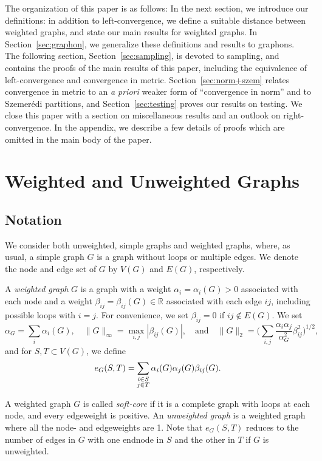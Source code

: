 \documentclass[12pt]{article}
\numberwithin{equation}{section}
\def\bsa{\begin{subarray}{c} }
\def\esa{\end{subarray} }
\def\R{{\mathbb R}}
\begin{document}
The organization of this paper is as follows: In the next section, we
introduce our definitions: in addition to left-convergence, we define
a suitable distance between weighted graphs, and state our main
results for weighted graphs.  In Section~\ref{sec:graphon}, we
generalize these definitions and results to graphons. The following
section, Section~\ref{sec:sampling}, is devoted to sampling, and
contains the proofs of the main results of this paper, including the
equivalence of left-convergence and convergence in metric.
Section~\ref{sec:norm+szem} relates convergence in metric to an
{\it a
priori} weaker form of ``convergence in norm'' and
to Szemer\'edi partitions, and Section~\ref{sec:testing} proves
our results on testing.  We close this paper with a section on
miscellaneous results and an outlook on right-convergence. In
the appendix, we describe a few details of proofs
which are omitted in the main body of the paper.

\section{Weighted and Unweighted Graphs}
\label{sec:graphs}

\subsection{Notation}
\label{sec:Notation}

We consider both unweighted, simple graphs and weighted graphs,
where, as usual, a simple graph $G$ is a graph without loops or
multiple edges. We denote the node and edge set of $G$ by $V(G)$ and
$E(G)$, respectively.

A {\it weighted graph} $G$ is a graph with a weight
$\alpha_i=\alpha_i(G)>0$ associated with each node and a weight
$\beta_{ij}=\beta_{ij}{(G)}\in\R$ associated with each edge $ij$,
including possible loops with $i=j$. For convenience, we set
$\beta_{ij}=0$ if $ij\notin E(G)$. We set
\[\alpha_G=\sum_i\alpha_i(G),\quad
\|G\|_\infty=\max_{i,j}|\beta_{ij}(G)|,
\quad\text{and}\quad
\|G\|_2=
\Biggl(\sum_{i,j}\frac{\alpha_i\alpha_j}{\alpha_G^2}\beta_{ij}^2
\biggr)^{1/2},
\]
and for $S,T\subset V(G)$, we define
\begin{equation}
\label{eG-def}
e_G(S,T)=\sum_{\bsa i\in S\\ j\in T\esa}
\alpha_i(G)\alpha_j(G)\beta_{ij}(G).
\end{equation}

A weighted graph $G$ is called {\it soft-core} if it is a complete
graph with loops at each node, and every edgeweight is positive. An
{\it unweighted graph} is a weighted graph where all the node- and
edgeweights are 1. Note that $e_G(S,T)$ reduces to the number of
edges in $G$ with one endnode in $S$ and the other in $T$ if $G$ is
unweighted.
\end{document}
